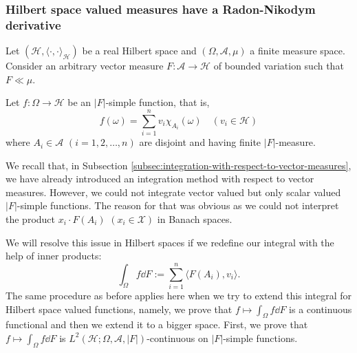 \documentclass[a4paper, 12pt]{article}
\begin{document}
\subsubsection*{Hilbert space valued measures have a Radon\--Nikodym derivative}
Let $(\mathcal{H}, \langle \cdot, \cdot \rangle_{\mathcal{H}})$ be a real Hilbert space and $(\Omega, \mathcal{A}, \mu)$ a finite measure space. Consider an arbitrary vector measure $F \colon \mathcal{A} \to \mathcal{H}$ of bounded variation such that $F \ll \mu$.

Let $f:\Omega \to \mathcal{H}$ be an $|F|$-simple function, that is,
$$f(\omega) = \sum^{n}_{i=1} v_i \chi_{A_i}(\omega) \quad (v_i \in \mathcal{H})$$
where $A_i \in \mathcal{A}$ $(i = 1,2,\ldots, n)$ are disjoint and having finite $|F|$-measure.

We recall that, in Subsection \ref{subsec:integration-with-respect-to-vector-measures}, we have already introduced an integration method with respect to vector measures. However, we could not integrate vector valued but only scalar valued $|F|$-simple functions. The reason for that was obvious as we could not interpret the product $x_i \cdot F(A_i)$ $(x_i \in \mathcal{X})$ in Banach spaces.

We will resolve this issue in Hilbert spaces if we redefine our integral with the help of inner products:
$$\int_{\Omega} f \dd{F} := \sum^{n}_{i=1} \langle  F(A_i), v_i\rangle.$$
The same procedure as before applies here when we try to extend this integral for Hilbert space valued functions, namely, we prove that $f \mapsto \int_{\Omega} f \dd{F}$ is a continuous functional and then we extend it to a bigger space. First, we prove that $f \mapsto \int_{\Omega} f \dd{F}$ is $L^2(\mathcal{H}; \Omega, \mathcal{A}, |F|)$-continuous on $|F|$-simple functions.
\end{document}
